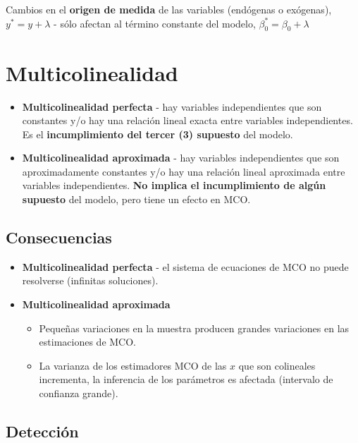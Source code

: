 \documentclass[10pt, a4paper, landscape]{article}
\begin{document}
\begin{multicols}{3}
Cambios en el \textbf{origen de medida} de las variables (endógenas o exógenas), \( y^{*} = y + \lambda \) - sólo afectan al término constante del modelo, \( \beta_{0}^{*} = \beta_{0} + \lambda \)

\columnbreak

\section*{Multicolinealidad}

\begin{itemize}[leftmargin=*]
	\item \textbf{Multicolinealidad perfecta} - hay variables independientes que son constantes y/o hay una relación lineal exacta entre variables independientes. Es el \textbf{incumplimiento del tercer (3) supuesto} del modelo.
	\item \textbf{Multicolinealidad aproximada} - hay variables independientes que son aproximadamente constantes y/o hay una relación lineal aproximada entre variables independientes. \textbf{No implica el incumplimiento de algún supuesto} del modelo, pero tiene un efecto en MCO.
\end{itemize}

\subsection*{Consecuencias}

\begin{itemize}[leftmargin=*]
	\item \textbf{Multicolinealidad perfecta} - el sistema de ecuaciones de MCO no puede resolverse (infinitas soluciones).
	\item \textbf{Multicolinealidad aproximada}
	\begin{itemize}[leftmargin=*]
		\item Pequeñas variaciones en la muestra producen grandes variaciones en las estimaciones de MCO.
		\item La varianza de los estimadores MCO de las \( x \) que son colineales incrementa, la inferencia de los parámetros es afectada (intervalo de confianza grande).
	\end{itemize}
\end{itemize}

\subsection*{Detección}


\end{multicols}
\end{document}

